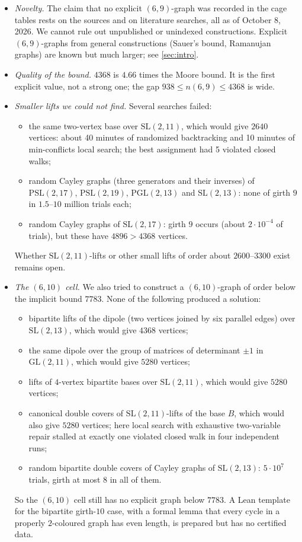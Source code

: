 \documentclass[11pt]{article}
\numberwithin{equation}{section}
\theoremstyle{definition}
\theoremstyle{remark}
\newcommand{\SL}{\mathrm{SL}}
\begin{document}
\begin{itemize}
\item \emph{Novelty.} The claim that no explicit $(6,9)$-graph was recorded in the cage tables
  rests on the sources \cite{ExJa,EGJSV,HoGcages} and on literature searches, all as of
  October 8, 2026. We cannot rule out unpublished or unindexed constructions. Explicit
  $(6,9)$-graphs from general constructions (Sauer's bound, Ramanujan graphs) are known but much
  larger; see \cref{sec:intro}.
\item \emph{Quality of the bound.} $4368$ is $4.66$ times the Moore bound. It is the first explicit
  value, not a strong one; the gap $938\le n(6,9)\le4368$ is wide.
\item \emph{Smaller lifts we could not find.} Several searches failed:
  \begin{itemize}
  \item the same two-vertex base over $\SL(2,11)$, which would give $2640$ vertices: about 40
    minutes of randomized backtracking and 10 minutes of min-conflicts local search; the best
    assignment had 5 violated closed walks;
  \item random Cayley graphs (three generators and their inverses) of $\mathrm{PSL}(2,17)$,
    $\mathrm{PSL}(2,19)$, $\mathrm{PGL}(2,13)$ and $\SL(2,13)$: none of girth $9$ in $1.5$--$10$
    million trials each;
  \item random Cayley graphs of $\SL(2,17)$: girth $9$ occurs (about $2\cdot10^{-4}$ of trials),
    but these have $4896>4368$ vertices.
  \end{itemize}
  Whether $\SL(2,11)$-lifts or other small lifts of order about $2600$--$3300$ exist remains open.
\item \emph{The $(6,10)$ cell.} We also tried to construct a $(6,10)$-graph of order below the
  implicit bound $7783$. None of the following produced a solution:
  \begin{itemize}
  \item bipartite lifts of the dipole (two vertices joined by six parallel edges) over $\SL(2,13)$,
    which would give $4368$ vertices;
  \item the same dipole over the group of matrices of determinant $\pm1$ in $\mathrm{GL}(2,11)$,
    which would give $5280$ vertices;
  \item lifts of $4$-vertex bipartite bases over $\SL(2,11)$, which would give $5280$ vertices;
  \item canonical double covers of $\SL(2,11)$-lifts of the base $B$, which would also give $5280$
    vertices; here local search with exhaustive two-variable repair stalled at exactly one violated
    closed walk in four independent runs;
  \item random bipartite double covers of Cayley graphs of $\SL(2,13)$: $5\cdot10^7$ trials, girth
    at most $8$ in all of them.
  \end{itemize}
  So the $(6,10)$ cell still has no explicit graph below $7783$. A Lean template for the bipartite
  girth-$10$ case, with a formal lemma that every cycle in a properly $2$-coloured graph has even
  length, is prepared but has no certified data.
\end{itemize}
\end{document}

